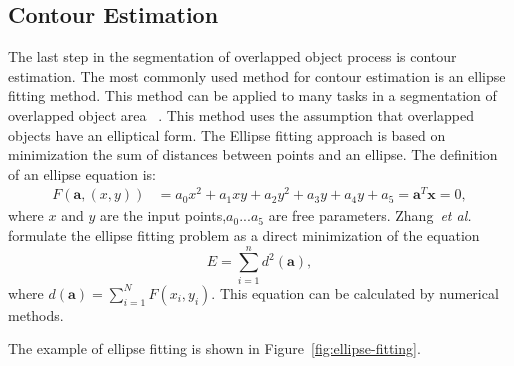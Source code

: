 \documentclass{lutmscthesis}[2010/09/22]
\begin{document}
\subsection{Contour Estimation}
\label{ContourEstimation}
The last step in the segmentation of overlapped object process is contour estimation. The most commonly used method for contour estimation is an ellipse fitting method. This method can be applied to many tasks in a segmentation of overlapped object area ~\cite{BE-FRS,Zhao2017,zafari-bb,LANGLARD2018}. This method uses the assumption that overlapped objects have an elliptical form. The Ellipse fitting approach is based on minimization the sum of distances between points and an ellipse. The definition of an ellipse equation is:
\begin{align}
    F(\textbf{a},(x,y)) &= a_0x^2 + a_1xy + a_2y^2 + a_3y + a_4y + a_5 = \textbf{a}^T \mathbf{x} = 0,
\end{align}
where $x$ and $y$ are the input points,$a_0...a_5$ are free parameters. Zhang~\emph{et al.}~\cite{acos_1} formulate the ellipse fitting problem as a  direct minimization of the equation 
\begin{equation}
    E = \sum_{i=1}^{n}d^2(\textbf{a}),
\end{equation}
where $d(\textbf{a}) = \sum_{i=1}^N{F(x_i, y_i)}$. This equation can be calculated by numerical methods.

The example of ellipse fitting is shown in Figure~\ref{fig:ellipse-fitting}.


\begin{figure}[htp]
\end{figure}
\end{document}
